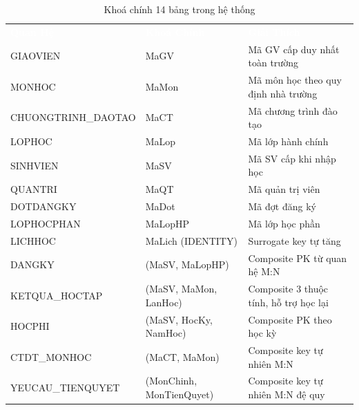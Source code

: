 \documentclass[13pt, a4paper]{article}
\begin{document}
\begin{table}[H]
\centering
\renewcommand{\arraystretch}{1.35}
\begin{tabular}{p{3.8cm} p{4cm} p{5.5cm}}
  \rowcolor{tableheadbg}
  \textcolor{white}{\textbf{Quan Hệ}} &
  \textcolor{white}{\textbf{Khoá Chính}} &
  \textcolor{white}{\textbf{Giải Thích}} \\
  \rowcolor{white}      GIAOVIEN              & MaGV                        & Mã GV cấp duy nhất toàn trường \\
  \rowcolor{tablerowalt}MONHOC                & MaMon                       & Mã môn học theo quy định nhà trường \\
  \rowcolor{white}      CHUONGTRINH\_DAOTAO   & MaCT                        & Mã chương trình đào tạo \\
  \rowcolor{tablerowalt}LOPHOC                & MaLop                       & Mã lớp hành chính \\
  \rowcolor{white}      SINHVIEN              & MaSV                        & Mã SV cấp khi nhập học \\
  \rowcolor{tablerowalt}QUANTRI               & MaQT                        & Mã quản trị viên \\
  \rowcolor{white}      DOTDANGKY             & MaDot                       & Mã đợt đăng ký \\
  \rowcolor{tablerowalt}LOPHOCPHAN            & MaLopHP                     & Mã lớp học phần \\
  \rowcolor{white}      LICHHOC               & MaLich (IDENTITY)           & Surrogate key tự tăng \\
  \rowcolor{tablerowalt}DANGKY                & (MaSV, MaLopHP)             & Composite PK từ quan hệ M:N \\
  \rowcolor{white}      KETQUA\_HOCTAP        & (MaSV, MaMon, LanHoc)       & Composite 3 thuộc tính, hỗ trợ học lại \\
  \rowcolor{tablerowalt}HOCPHI                & (MaSV, HocKy, NamHoc)       & Composite PK theo học kỳ \\
  \rowcolor{white}      CTDT\_MONHOC          & (MaCT, MaMon)               & Composite key tự nhiên M:N \\
  \rowcolor{tablerowalt}YEUCAU\_TIENQUYET     & (MonChinh, MonTienQuyet)    & Composite key tự nhiên M:N đệ quy \\
\end{tabular}
\caption{Khoá chính 14 bảng trong hệ thống}
\end{table}
\end{document}
